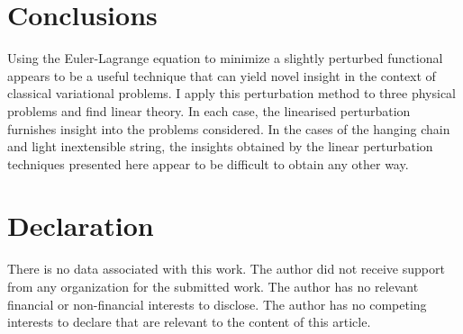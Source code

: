 \documentclass[pdflatex,sn-mathphys-num]{sn-jnl}%
\theoremstyle{thmstyleone}%
\theoremstyle{thmstyletwo}%
\theoremstyle{thmstylethree}%
\begin{document}
\section{Conclusions}

Using the Euler-Lagrange equation to minimize a slightly perturbed
functional appears to be a useful technique that can yield novel
insight in the context of classical variational problems.  I apply
this perturbation method to three physical problems and find linear
theory.  In each case, the linearised perturbation furnishes insight
into the problems considered.  In the cases of the hanging chain and
light inextensible string, the insights obtained by the linear
perturbation techniques presented here appear to be difficult to
obtain any other way.

\section*{Declaration}

There is no data associated with this work.
The author did not receive support from any organization for the
submitted work.  The author has no relevant financial or non-financial
interests to disclose.  The author has no competing interests to
declare that are relevant to the content of this article.

\end{document}
